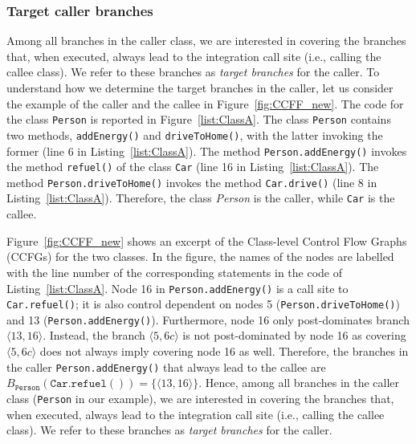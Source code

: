 \subsubsection{Target caller branches}
Among all branches in the caller class, we are interested in covering the branches that, when executed, always lead to the integration call site (i.e., calling the callee class). We refer to these branches as \textit{target branches} for the caller.
To understand how we determine the target branches in the caller, 
let us consider the example of the caller and the callee in Figure~\ref{fig:CCFF_new}. The code for the class \texttt{Person} is reported in Figure~\ref{list:ClassA}. The class \texttt{Person} contains two methods, \texttt{addEnergy()} and \texttt{driveToHome()}, with the latter invoking the former (line 6 in Listing~\ref{list:ClassA}). The method \texttt{Person.addEnergy()} invokes the method \texttt{refuel()} of the class \texttt{Car} (line 16 in Listing~\ref{list:ClassA}). The method \texttt{Person.driveToHome()} invokes the method \texttt{Car.drive()} (line 8 in Listing~\ref{list:ClassA}). Therefore, the class \textit{Person} is the caller, while \texttt{Car} is the callee. 

Figure~\ref{fig:CCFF_new} shows an excerpt of the Class-level Control Flow Graphs (CCFGs) for the two classes. In the figure, the names of the nodes are labelled with the line number of the corresponding statements in the code of Listing~\ref{list:ClassA}. Node 16 in \texttt{Person.addEnergy()} is a call site to \texttt{Car.refuel()}; it is also control dependent on nodes 5 (\texttt{Person.driveToHome()}) and 13 (\texttt{Person.addEnergy()}). Furthermore, node 16 only post-dominates branch $\langle 13,16\rangle$. Instead, the branch $\langle 5,6c\rangle$ is not post-dominated by  node 16 as covering $\langle 5,6c\rangle$ does not always imply covering node 16 as well. Therefore, the branches in the caller \texttt{Person.addEnergy()} that always lead to the callee are $B_{\mathtt{Person}}(\mathtt{Car.refuel()})=\{\langle 13,16\rangle\}$. 
Hence, among all branches in the caller class (\texttt{Person} in our example), we are interested in covering the branches that, when executed, always lead to the integration call site (i.e., calling the callee class). We refer to these branches as \textit{target branches} for the caller.
 
